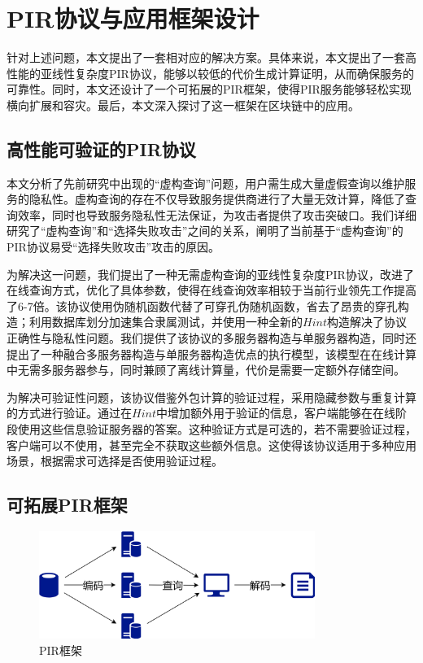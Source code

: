\section{PIR协议与应用框架设计}
针对上述问题，本文提出了一套相对应的解决方案。具体来说，本文提出了一套高性能的亚线性复杂度PIR协议，能够以较低的代价生成计算证明，从而确保服务的可靠性。同时，本文还设计了一个可拓展的PIR框架，使得PIR服务能够轻松实现横向扩展和容灾。最后，本文深入探讨了这一框架在区块链中的应用。
\subsection{高性能可验证的PIR协议}
本文分析了先前研究中出现的“虚构查询”问题，用户需生成大量虚假查询以维护服务的隐私性。虚构查询的存在不仅导致服务提供商进行了大量无效计算，降低了查询效率，同时也导致服务隐私性无法保证，为攻击者提供了攻击突破口。我们详细研究了“虚构查询”和“选择失败攻击”之间的关系，阐明了当前基于“虚构查询”的PIR协议易受“选择失败攻击”攻击的原因。

为解决这一问题，我们提出了一种无需虚构查询的亚线性复杂度PIR协议，改进了在线查询方式，优化了具体参数，使得在线查询效率相较于当前行业领先工作\cite{C:LazPap23,Piano}提高了6-7倍。该协议使用伪随机函数代替了可穿孔伪随机函数，省去了昂贵的穿孔构造；利用数据库划分加速集合隶属测试，并使用一种全新的$Hint$构造解决了协议正确性与隐私性问题。我们提供了该协议的多服务器构造与单服务器构造，同时还提出了一种融合多服务器构造与单服务器构造优点的执行模型，该模型在在线计算中无需多服务器参与，同时兼顾了离线计算量，代价是需要一定额外存储空间。

为解决可验证性问题，该协议借鉴外包计算的验证过程，采用隐藏参数与重复计算的方式进行验证。通过在$Hint$中增加额外用于验证的信息，客户端能够在在线阶段使用这些信息验证服务器的答案。这种验证方式是可选的，若不需要验证过程，客户端可以不使用，甚至完全不获取这些额外信息。这使得该协议适用于多种应用场景，根据需求可选择是否使用验证过程。

\subsection{可拓展PIR框架}

\begin{figure}
    \centering
    \includegraphics[width=0.8\textwidth]{figure/PIR-framework.png}
    \caption{PIR框架}
    \label{fig:pir-framework}
\end{figure}


